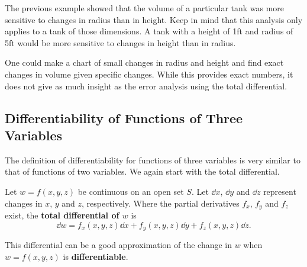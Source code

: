 The previous example showed that the volume of a particular tank was more sensitive to changes in radius than in height. Keep in mind that this analysis only applies to a tank of those dimensions. A tank with a height of 1ft and radius of 5ft would be more sensitive to changes in height than in radius.

One could make a chart of small changes in radius and height and find exact changes in volume given specific changes. While this provides exact numbers, it does not give as much insight as the error analysis using the total differential.

\subsection{Differentiability of Functions of Three Variables}

The definition of differentiability for functions of three variables is very similar to that of functions of two variables. We again start with the total differential.

\begin{definition}\label{def:total_differential3}%
Let $w=f(x,y,z)$ be continuous on an open set $S$. Let $\dd x$, $\dd y$ and $\dd z$ represent changes in $x$, $y$ and  $z$, respectively. Where the partial derivatives $f_x$, $f_y$ and $f_z$ exist, the \textbf{total differential of $w$} is
\[\dd w = f_x(x,y,z)\dd x + f_y(x,y,z)\dd y+f_z(x,y,z)\dd z.\]
\end{definition}

This differential can be a good approximation of the change in $w$ when $w = f(x,y,z)$ is \textbf{differentiable}.

